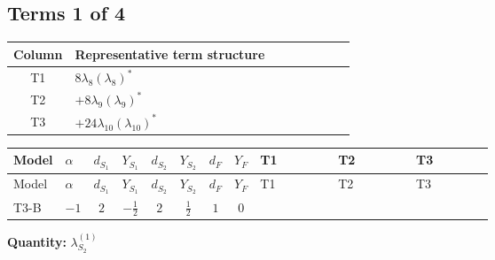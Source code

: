 \documentclass[8pt]{article}
\begin{document}
\begin{landscape}
\subsection*{Terms 1 of 4}
\begin{center}
\begin{tabular}{@{}c >{\raggedright\arraybackslash}p{0.82\linewidth}@{}}
\toprule
Column & Representative term structure \\
\midrule
T1 & \(\displaystyle 8 {\lambda_{8}} \left({\lambda_{8}}\right)^{*}\) \\
\midrule
T2 & \(\displaystyle +8 {\lambda_{9}} \left({\lambda_{9}}\right)^{*}\) \\
\midrule
T3 & \(\displaystyle +24 {\lambda_{10}} \left({\lambda_{10}}\right)^{*}\) \\
\midrule
\bottomrule
\end{tabular}
\end{center}
\smallskip
\tiny
\begin{longtable}{@{}llcccccc >{\raggedright\arraybackslash}p{0.21\linewidth} >{\raggedright\arraybackslash}p{0.21\linewidth} >{\raggedright\arraybackslash}p{0.21\linewidth}@{}}
\toprule
Model & $\alpha$ & $d_{S_1}$ & $Y_{S_1}$ & $d_{S_2}$ & $Y_{S_2}$ & $d_F$ & $Y_F$ & T1 & T2 & T3 \\
\midrule
\endfirsthead
\toprule
Model & $\alpha$ & $d_{S_1}$ & $Y_{S_1}$ & $d_{S_2}$ & $Y_{S_2}$ & $d_F$ & $Y_F$ & T1 & T2 & T3 \\
\midrule
\endhead
T3-B & $-1$ & $2$ & $-\frac{1}{2}$ & $2$ & $\frac{1}{2}$ & $1$ & $0$ & \scriptsize\adjustbox{max width=\linewidth}{$\begin{gathered} 8 {\lambda_{8}} \left({\lambda_{8}}\right)^{*}\end{gathered}$} & \scriptsize\adjustbox{max width=\linewidth}{$\begin{gathered} +8 {\lambda_{9}} \left({\lambda_{9}}\right)^{*}\end{gathered}$} & \scriptsize\adjustbox{max width=\linewidth}{$\begin{gathered} +24 {\lambda_{10}} \left({\lambda_{10}}\right)^{*}\end{gathered}$} \\
\midrule
\bottomrule
\end{longtable}
\clearpage
\noindent\textbf{Quantity: }$\lambda_{S_2}^{(1)}$\par\smallskip

\end{landscape}
\end{document}
